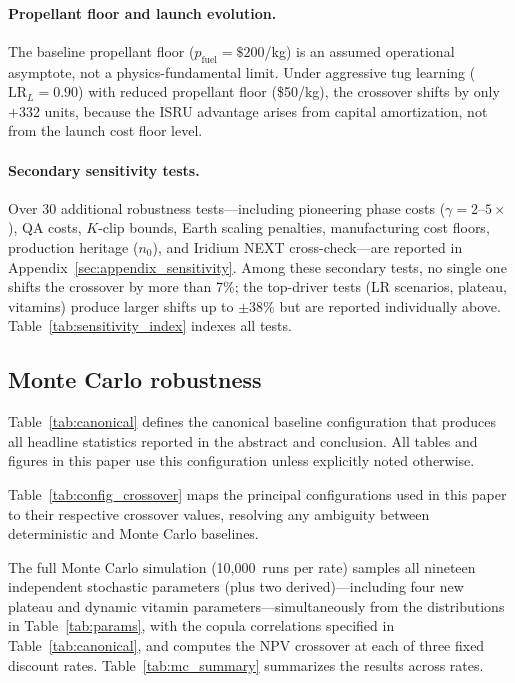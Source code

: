 \paragraph{Propellant floor and launch evolution.} The baseline propellant floor ($p_{\mathrm{fuel}} = \$200$/kg) is an assumed operational asymptote, not a physics-fundamental limit. Under aggressive tug learning ($\mathrm{LR}_L = 0.90$) with reduced propellant floor (\$50/kg), the crossover shifts by only $+$332 units, because the ISRU advantage arises from capital amortization, not from the launch cost floor level.

\paragraph{Secondary sensitivity tests.} Over 30 additional robustness tests---including pioneering phase costs ($\gamma = 2$--$5\times$), QA costs, $K$-clip bounds, Earth scaling penalties, manufacturing cost floors, production heritage ($n_0$), and Iridium NEXT cross-check---are reported in Appendix~\ref{sec:appendix_sensitivity}. Among these secondary tests, no single one shifts the crossover by more than 7\%; the top-driver tests (LR scenarios, plateau, vitamins) produce larger shifts up to $\pm$38\% but are reported individually above. Table~\ref{tab:sensitivity_index} indexes all tests.



\subsection{Monte Carlo robustness}
\label{sec:mc_robustness}

Table~\ref{tab:canonical} defines the canonical baseline configuration that produces all headline statistics reported in the abstract and conclusion. All tables and figures in this paper use this configuration unless explicitly noted otherwise.



Table~\ref{tab:config_crossover} maps the principal configurations used in this paper to their respective crossover values, resolving any ambiguity between deterministic and Monte Carlo baselines.



The full Monte Carlo simulation (10{,}000~runs per rate) samples all nineteen independent stochastic parameters (plus two derived)---including four new plateau and dynamic vitamin parameters---simultaneously from the distributions in Table~\ref{tab:params}, with the copula correlations specified in Table~\ref{tab:canonical}, and computes the NPV crossover at each of three fixed discount rates. Table~\ref{tab:mc_summary} summarizes the results across rates.

